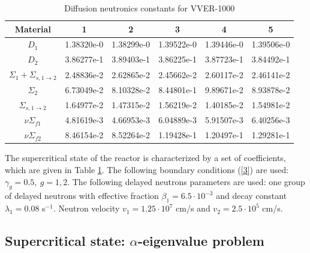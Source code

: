 \documentclass[authoryear]{elsarticle}
\begin{document}
\begin{table}[htp]
\caption{Diffusion neutronics constants for VVER-1000}
\label{t-1}
\begin{center}
\begin{tabular}{|c|c|c|c|c|c|}
\hline
Material & 1 & 2 & 3 & 4 & 5\\
\hline
$D_1$ & 1.38320e-0 & 1.38299e-0  & 1.39522e-0  & 1.39446e-0  & 1.39506e-0 \\
$D_2$ & 3.86277e-1 & 3.89403e-1 & 3.86225e-1 & 3.87723e-1 & 3.84492e-1 \\
$\Sigma_1 + \Sigma_{s,1\rightarrow 2}$ & 2.48836e-2 & 2.62865e-2 & 2.45662e-2 & 2.60117e-2 & 2.46141e-2\\
$\Sigma_2$ & 6.73049e-2 & 8.10328e-2 & 8.44801e-1 & 9.89671e-2 & 8.93878e-2\\
$\Sigma_{s,1\rightarrow 2}$ & 1.64977e-2 & 1.47315e-2 & 1.56219e-2 & 1.40185e-2 & 1.54981e-2\\
$\nu\Sigma_{f1}$ & 4.81619e-3 & 4.66953e-3 & 6.04889e-3 & 5.91507e-3 & 6.40256e-3\\
$\nu\Sigma_{f2}$ & 8.46154e-2 & 8.52264e-2 & 1.19428e-1 & 1.20497e-1 & 1.29281e-1\\
\hline
\end{tabular}
\end{center}
\end{table}

The supercritical state of the reactor is characterized by a set of coefficients, which are given in Table \ref{t-1}. 
The following boundary conditions (\ref{3}) are used:  $\gamma_g = 0.5, \ g = 1,2$.  
The following delayed neutrons parameters are used: one group of delayed neutrons with effective fraction $\beta_1 = 6.5\cdot10^{-3}$ and decay constant $\lambda_1 = 0.08$ s$^{-1}$. 
Neutron velocity  $v_1 = 1.25 \cdot 10^7$ cm/s and $v_2 = 2.5 \cdot 10^5$ cm/s.

\subsection{Supercritical state: $\alpha$-eigenvalue problem} 
\end{document}
